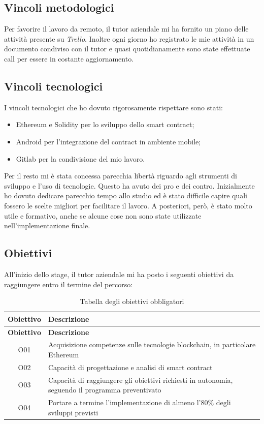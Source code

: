 \subsection{Vincoli metodologici}
Per favorire il lavoro da remoto, il tutor aziendale mi ha fornito un piano delle attività presente su \emph{\gls{Trello}}\glsfirstoccur. Inoltre ogni giorno ho registrato le mie attività in un documento condiviso con il tutor e quasi quotidianamente sono state effettuate call per essere in costante aggiornamento.


\subsection{Vincoli tecnologici}
I vincoli tecnologici che ho dovuto rigorosamente rispettare sono stati:
\begin{itemize}
	\item{Ethereum e Solidity per lo sviluppo dello smart contract;}
	\item{Android per l'integrazione del contract in ambiente mobile;}
	\item{Gitlab per la condivisione del mio lavoro.}
\end{itemize}
Per il resto mi è stata concessa parecchia libertà riguardo agli strumenti di sviluppo e l'uso di tecnologie. Questo ha avuto dei pro e dei contro. Inizialmente ho dovuto dedicare parecchio tempo allo studio ed è stato difficile capire quali fossero le scelte migliori per facilitare il lavoro. A posteriori, però, è stato molto utile e formativo, anche se alcune cose non sono state utilizzate nell'implementazione finale.
\subsection{Obiettivi}
\label{sec:obiettivi}
All'inizio dello stage, il tutor aziendale mi ha posto i seguenti obiettivi da raggiungere entro il termine del percorso:
\begin{center}
	\begin{longtable}{| c | p{30em} |}
		\caption{Tabella degli obiettivi obbligatori}
		\label{tab:obiettivi-obbligatori}\\
		\hline
		\textbf{Obiettivo} & \centering\textbf{Descrizione}\\
		\endfirsthead
		\hline
		\textbf{Obiettivo} & \centering\textbf{Descrizione}\\
		\endhead
		\endfoot
		
		\hline
		O01    & Acquisizione competenze sulle tecnologie blockchain, in particolare Ethereum  \\
		\hline
		O02    & Capacità di progettazione e analisi di smart contract \\
		\hline
		O03    & Capacità di raggiungere gli obiettivi richiesti in autonomia, seguendo il programma preventivato \\
		\hline
		O04    & Portare a termine l'implementazione di almeno l'80\% degli sviluppi previsti \\
		\hline
	\end{longtable}
\end{center}

